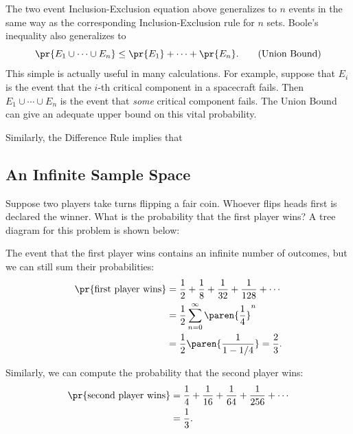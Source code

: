 The two event Inclusion-Exclusion equation above generalizes to $n$ events
in the same way as the corresponding Inclusion-Exclusion rule for $n$
sets.  Boole's inequality also generalizes to
\begin{equation}
\pr{E_1 \cup \cdots \cup E_n} \leq \pr{E_1} + \cdots + \pr{E_n}.\tag{Union Bound}
\end{equation}
This simple  is actually useful in many calculations.
For example, suppose that $E_i$ is the event that the $i$-th critical
component in a spacecraft fails.  Then $E_1 \cup \cdots \cup E_n$ is the
event that \emph{some} critical component fails.  The Union Bound can give
an adequate upper bound on this vital probability.

Similarly, the Difference Rule implies that


\subsection{An Infinite Sample Space}

Suppose two players take turns flipping a fair coin.  Whoever flips
heads first is declared the winner.  What is the probability that the
first player wins?  A tree diagram for this problem is shown below:


The event that the first player wins contains an infinite number of
outcomes, but we can still sum their probabilities:
\begin{align*}
\pr{\text{first player wins}}
    & = \frac{1}{2} + \frac{1}{8} + \frac{1}{32} + \frac{1}{128} + \cdots \\
    & = \frac{1}{2} \sum_{n=0}^\infty \paren{\frac{1}{4}}^n \\
    & = \frac{1}{2}\paren{\frac{1}{1-1/4}} = \frac{2}{3}.
\end{align*}

Similarly, we can compute the probability that the second player wins:
\begin{align*}
\pr{\text{second player wins}}
    & = \frac{1}{4} + \frac{1}{16} + \frac{1}{64} + \frac{1}{256}
                      + \cdots \\
    & = \frac{1}{3}.
\end{align*}

